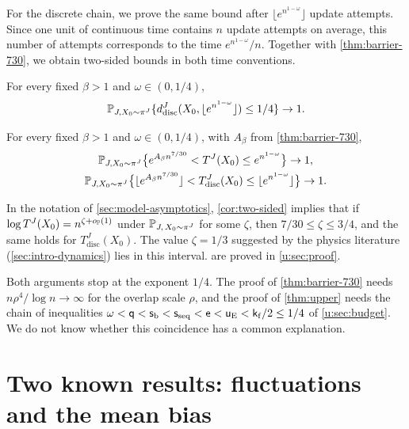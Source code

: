 For the discrete chain, we prove the same bound after
$\lfloor e^{n^{1-\omega}}\rfloor$ update attempts. Since one unit of
continuous time contains $n$ update attempts on average, this number of
attempts corresponds to the time $e^{n^{1-\omega}}/n$. Together with
\cref{thm:barrier-730}, we obtain two-sided bounds in both time
conventions.

\begin{corollary}\label{cor:upper-discrete}
For every fixed $\beta>1$ and $\omega\in(0,1/4)$,
\[
\mathbb P_{J,X_0\sim\pi^J}\{d^J_{\mathrm{disc}}(X_0,\lfloor e^{n^{1-\omega}}\rfloor)\le1/4\}\to1.
\]
\end{corollary}

\begin{corollary}\label{cor:two-sided}
For every fixed $\beta>1$ and $\omega\in(0,1/4)$, with $A_\beta$ from \cref{thm:barrier-730},
\begin{gather*}
\mathbb P_{J,X_0\sim\pi^J}\bigl\{e^{A_\beta n^{7/30}}<T^J(X_0)\le e^{n^{1-\omega}}\bigr\}\to1,\\
\mathbb P_{J,X_0\sim\pi^J}\bigl\{\lfloor e^{A_\beta n^{7/30}}\rfloor<T^J_{\mathrm{disc}}(X_0)\le \lfloor e^{n^{1-\omega}}\rfloor\bigr\}\to1 .
\end{gather*}
\end{corollary}

In the notation of \cref{sec:model-asymptotics}, \cref{cor:two-sided}
implies that if $\log T^J(X_0)=n^{\zeta+o_\mathbb P(1)}$ under
$\mathbb P_{J,\,X_0\sim\pi^J}$ for some $\zeta$, then $7/30\le\zeta\le3/4$, and the
same holds for $T^J_{\mathrm{disc}}(X_0)$. The value $\zeta=1/3$ suggested by
the physics literature (\cref{sec:intro-dynamics}) lies in this interval.
 are proved in \cref{u:sec:proof}.

Both arguments stop at the exponent $1/4$. The proof of
\cref{thm:barrier-730} needs $n\rho^4/\log n\to\infty$ for the overlap scale
$\rho$, and the proof of \cref{thm:upper} needs the chain of inequalities
$\omega<\mathsf q<\mathsf s_{\rm b}<\mathsf s_{\rm seq}<\mathsf e<\mathsf u_{\rm E}<\mathsf k_{\rm f}/2\le1/4$
of \cref{u:sec:budget}. We do not know whether this coincidence has a common
explanation.

\section{Two known results: fluctuations and the mean bias}\label{sec:intro-known}

